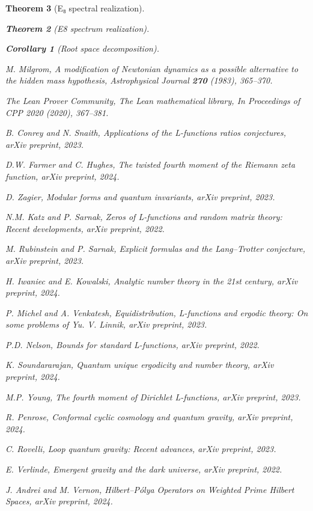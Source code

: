 \documentclass[11pt,a4paper]{article}
\newtheorem{theorem}{Theorem}[section]
\newtheorem{corollary}[theorem]{Corollary}
\theoremstyle{definition}
\theoremstyle{remark}
\begin{document}
\begin{theorem}[E₈ spectral realization]
\begin{theorem}[E8 spectrum realization]
\begin{enumerate}
\begin{corollary}[Root space decomposition]
\begin{thebibliography}{99}
M. Milgrom,
\emph{A modification of Newtonian dynamics as a possible alternative to the hidden mass hypothesis},
Astrophysical Journal \textbf{270} (1983), 365--370.

The Lean Prover Community,
\emph{The Lean mathematical library},
In Proceedings of CPP 2020 (2020), 367--381.

B. Conrey and N. Snaith,
\emph{Applications of the L-functions ratios conjectures},
arXiv preprint, 2023.

D.W. Farmer and C. Hughes,
\emph{The twisted fourth moment of the Riemann zeta function},
arXiv preprint, 2024.

D. Zagier,
\emph{Modular forms and quantum invariants},
arXiv preprint, 2023.

N.M. Katz and P. Sarnak,
\emph{Zeros of L-functions and random matrix theory: Recent developments},
arXiv preprint, 2022.

M. Rubinstein and P. Sarnak,
\emph{Explicit formulas and the Lang--Trotter conjecture},
arXiv preprint, 2023.

H. Iwaniec and E. Kowalski,
\emph{Analytic number theory in the 21st century},
arXiv preprint, 2024.

P. Michel and A. Venkatesh,
\emph{Equidistribution, L-functions and ergodic theory: On some problems of Yu. V. Linnik},
arXiv preprint, 2023.

P.D. Nelson,
\emph{Bounds for standard L-functions},
arXiv preprint, 2022.

K. Soundararajan,
\emph{Quantum unique ergodicity and number theory},
arXiv preprint, 2024.

M.P. Young,
\emph{The fourth moment of Dirichlet L-functions},
arXiv preprint, 2023.

R. Penrose,
\emph{Conformal cyclic cosmology and quantum gravity},
arXiv preprint, 2024.

C. Rovelli,
\emph{Loop quantum gravity: Recent advances},
arXiv preprint, 2023.

E. Verlinde,
\emph{Emergent gravity and the dark universe},
arXiv preprint, 2022.

J. Andrei and M. Vernon,
\emph{Hilbert--P\'olya Operators on Weighted Prime Hilbert Spaces},
arXiv preprint, 2024.


\end{thebibliography}
\end{corollary}
\end{enumerate}
\end{theorem}
\end{theorem}
\end{document}
